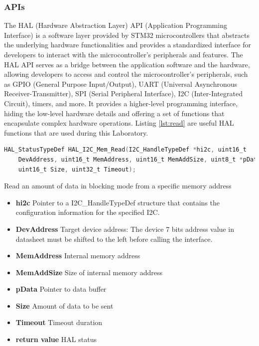 \documentclass[english]{article}
\begin{document}
\subsubsection{APIs}
The HAL (Hardware Abstraction Layer) API (Application Programming Interface) 
is a software layer provided by STM32 microcontrollers that abstracts
 the underlying hardware functionalities and provides a standardized 
 interface for developers to interact with the microcontroller's peripherals and features.
The HAL API serves as a bridge between the application software and the hardware, 
allowing developers to access and control the microcontroller's peripherals,
such as GPIO (General Purpose Input/Output), UART (Universal Asynchronous Receiver-Transmitter),
SPI (Serial Peripheral Interface), I2C (Inter-Integrated Circuit), 
timers, and more. It provides a higher-level programming interface,
hiding the low-level hardware details and offering a set of functions that
encapsulate complex hardware operations. \newline
Listing \ref{lst:read} are useful HAL functions that are used during this Laboratory.
\begin{lstlisting}[language=C, caption={Reading Register values}, label={lst:read} ]
HAL_StatusTypeDef HAL_I2C_Mem_Read(I2C_HandleTypeDef *hi2c, uint16_t
    DevAddress, uint16_t MemAddress, uint16_t MemAddSize, uint8_t *pData,
    uint16_t Size, uint32_t Timeout);
\end{lstlisting}
Read an amount of data in blocking mode from a specific memory address  
\begin{itemize}
    \item \textbf{hi2c} Pointer to a I2C\_HandleTypeDef structure that contains the configuration information
    for the specified I2C.
    \item \textbf{DevAddress} Target device address: The device 7 bits address value in datasheet must be
    shifted to the left before calling the interface.
    \item \textbf{MemAddress} Internal memory address
    \item \textbf{MemAddSize} Size of internal memory address
    \item \textbf{pData} Pointer to data buffer
    \item \textbf{Size} Amount of data to be sent
    \item \textbf{Timeout} Timeout duration
    \item \textbf{return value} HAL status
\end{itemize}
\end{document}

